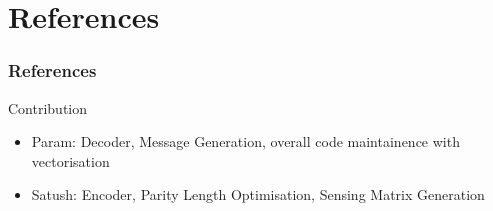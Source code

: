 \documentclass[aspectratio=169, handout, 10pt, hyperref=colorlinks]{beamer}
\begin{document}



\section{References}
\begin{frame}%
  \frametitle<presentation>{References}
%       

  \nocite{*}
  {}
    

 
    

\end{frame}

\begin{frame}{Contribution}
    \begin{itemize}
        \item Param: Decoder, Message Generation, overall code maintainence with vectorisation
        \item Satush: Encoder, Parity Length Optimisation, Sensing Matrix Generation
    \end{itemize}
\end{frame}
\end{document}
